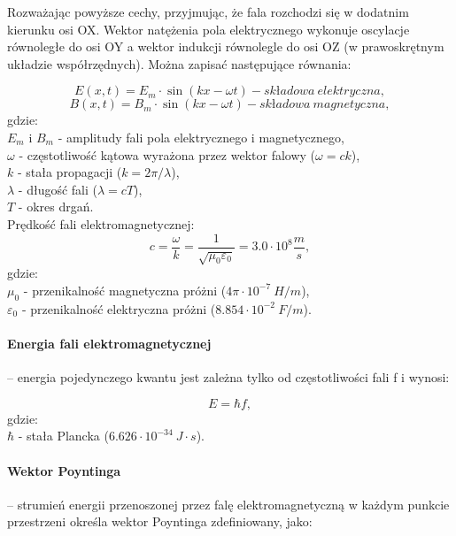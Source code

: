 \documentclass[a4paper,twoside]{report}
\begin{document}
Rozważając powyższe cechy, przyjmując, że fala rozchodzi się w dodatnim kierunku osi OX. Wektor natężenia pola elektrycznego wykonuje oscylacje równoległe do osi OY a wektor indukcji równolegle do osi OZ (w prawoskrętnym układzie współrzędnych). Można zapisać następujące równania:

\begin{equation}
E(x,t) = E_m \cdot \sin (kx - \omega t) - składowa~elektryczna,
\end{equation}
\begin{equation}
B(x,t) = B_m \cdot \sin (kx - \omega t) - składowa~magnetyczna,
\end{equation}
gdzie:\\
$E_m$ i $B_m$ - amplitudy fali pola elektrycznego i magnetycznego,\\
$\omega$ - częstotliwość kątowa wyrażona przez wektor falowy ($\omega = ck$),\\
$k$ - stała propagacji ($k = 2\pi /\lambda$),\\
$\lambda$ - długość fali ($\lambda=cT$),\\
$T$ - okres drgań.\\

Prędkość fali elektromagnetycznej:
\begin{equation}
c=\dfrac{\omega}{k} = \dfrac{1}{\sqrt{\mu _0 \varepsilon _0}} = 3.0 \cdot 10^8 \dfrac{m}{s},
\end{equation}
gdzie:\\
$\mu _0$ - przenikalność magnetyczna próżni ($4\pi \cdot 10^{-7}~H/m$),\\
$\varepsilon _0$ - przenikalność elektryczna próżni ($8.854 \cdot 10^{-2}~F/m$).\\

\paragraph{Energia fali elektromagnetycznej} – energia pojedynczego kwantu jest zależna tylko od częstotliwości fali f i wynosi:

\begin{equation}
E = \hbar f,
\end{equation}
gdzie:\\
$\hbar$ - stała Plancka ($6.626 \cdot 10^{-34}~J \cdot s$). 

\paragraph{Wektor Poyntinga} – strumień energii przenoszonej przez falę elektromagnetyczną w każdym punkcie przestrzeni określa wektor Poyntinga zdefiniowany, jako:
\end{document}
